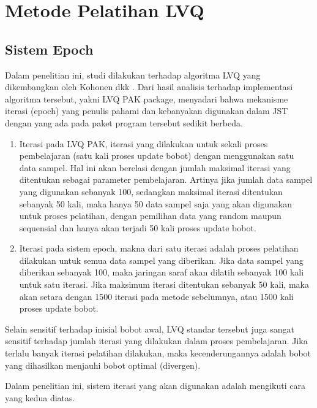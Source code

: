 \clearpage

\section{Metode Pelatihan LVQ}
\subsection{Sistem Epoch}
Dalam penelitian ini, studi dilakukan terhadap algoritma LVQ yang dikembangkan
oleh Kohonen dkk \cite{Kohonen92lvqpak}. Dari hasil analisis terhadap
implementasi algoritma tersebut, yakni LVQ PAK package, \saya menyadari bahwa
mekanisme iterasi (epoch) yang penulis pahami dan kebanyakan digunakan
dalam JST dengan yang ada pada paket program tersebut sedikit berbeda.
\begin{enumerate}
  \item Iterasi pada LVQ PAK, iterasi yang dilakukan untuk sekali proses
  pembelajaran (satu kali proses update bobot) dengan menggunakan satu data
  sampel. Hal ini akan berelasi dengan jumlah maksimal iterasi yang ditentukan
  sebagai parameter pembelajaran. Artinya jika jumlah data sampel yang digunakan
  sebanyak 100, sedangkan maksimal iterasi ditentukan sebanyak 50 kali, maka
  hanya 50 data sampel saja yang akan digunakan untuk proses pelatihan, dengan
  pemilihan data yang random maupun sequensial dan hanya akan terjadi 50 kali
  proses update bobot.
  \item Iterasi pada sistem epoch, makna dari satu iterasi adalah
  proses pelatihan dilakukan untuk semua data sampel yang diberikan. Jika data
  sampel yang diberikan sebanyak 100, maka jaringan saraf akan dilatih sebanyak
  100 kali untuk satu iterasi. Jika maksimum iterasi ditentukan sebanyak 50
  kali, maka akan setara dengan 1500 iterasi pada metode sebelumnya, atau 1500
  kali proses update bobot.
\end{enumerate}

Selain sensitif terhadap inisial bobot awal, LVQ standar tersebut juga sangat
sensitif terhadap jumlah iterasi yang dilakukan dalam proses pembelajaran. Jika
terlalu banyak iterasi pelatihan dilakukan, maka kecenderungannya adalah bobot
yang dihasilkan menjauhi bobot optimal (divergen)\cite{Sato:1995}.

\noindent Dalam penelitian ini, sistem iterasi yang akan digunakan adalah
mengikuti cara yang kedua diatas.
% 
% 
